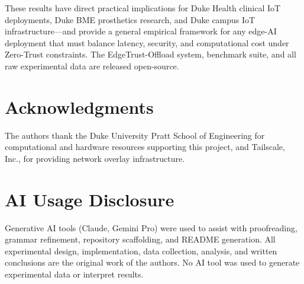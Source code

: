 \documentclass[10pt,twocolumn]{article}
\begin{document}
These results have direct practical implications for Duke Health clinical IoT
deployments, Duke BME prosthetics research, and Duke campus IoT
infrastructure—and provide a general empirical framework for any edge-AI
deployment that must balance latency, security, and computational cost under
Zero-Trust constraints.  The EdgeTrust-Offload system, benchmark suite, and
all raw experimental data are released open-source.

\section*{Acknowledgments}

The authors thank the Duke University Pratt School of Engineering for
computational and hardware resources supporting this project, and Tailscale,
Inc., for providing network overlay infrastructure.

\section*{AI Usage Disclosure}

Generative AI tools (Claude, Gemini Pro) were used to assist with
proofreading, grammar refinement, repository scaffolding, and README
generation.  All experimental design, implementation, data collection,
analysis, and written conclusions are the original work of the authors.
No AI tool was used to generate experimental data or interpret results.


\end{document}
